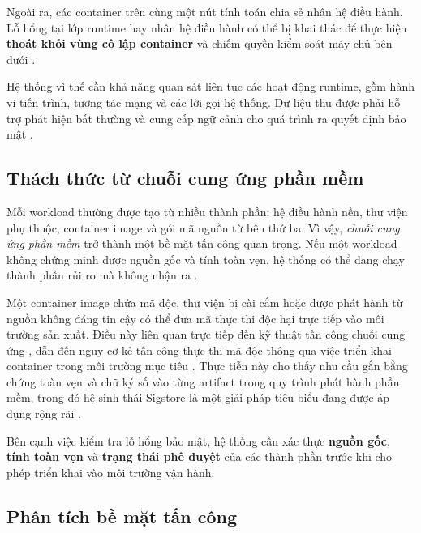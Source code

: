 Ngoài ra, các container trên cùng một nút tính toán chia sẻ nhân hệ điều hành. Lỗ hổng tại lớp runtime hay nhân hệ điều hành có thể bị khai thác để thực hiện \textbf{thoát khỏi vùng cô lập container} và chiếm quyền kiểm soát máy chủ bên dưới \parencite{cve_2024_21626,cve_2022_0847,mitre_t1611}.

Hệ thống vì thế cần khả năng quan sát liên tục các hoạt động runtime, gồm hành vi tiến trình, tương tác mạng và các lời gọi hệ thống. Dữ liệu thu được phải hỗ trợ phát hiện bất thường và cung cấp ngữ cảnh cho quá trình ra quyết định bảo mật \parencite{nist800137,nist800204c_devsecops_microservices,hubble_docs,tetragon_docs}.

\subsection{Thách thức từ chuỗi cung ứng phần mềm}

Mỗi workload thường được tạo từ nhiều thành phần: hệ điều hành nền, thư viện phụ thuộc, container image và gói mã nguồn từ bên thứ ba. Vì vậy, \textit{chuỗi cung ứng phần mềm} trở thành một bề mặt tấn công quan trọng. Nếu một workload không chứng minh được nguồn gốc và tính toàn vẹn, hệ thống có thể đang chạy thành phần rủi ro mà không nhận ra \parencite{cncf_swp,newman2022sigstore,sigstore_docs}.

Một container image chứa mã độc, thư viện bị cài cắm hoặc được phát hành từ nguồn không đáng tin cậy có thể đưa mã thực thi độc hại trực tiếp vào môi trường sản xuất. Điều này liên quan trực tiếp đến kỹ thuật tấn công chuỗi cung ứng \parencite{mitre_t1195_002}, dẫn đến nguy cơ kẻ tấn công thực thi mã độc thông qua việc triển khai container trong môi trường mục tiêu \parencite{mitre_t1610}. Thực tiễn này cho thấy nhu cầu gắn bằng chứng toàn vẹn và chữ ký số vào từng artifact trong quy trình phát hành phần mềm, trong đó hệ sinh thái Sigstore là một giải pháp tiêu biểu đang được áp dụng rộng rãi \parencite{newman2022sigstore,sigstore_docs}.

Bên cạnh việc kiểm tra lỗ hổng bảo mật, hệ thống cần xác thực \textbf{nguồn gốc}, \textbf{tính toàn vẹn} và \textbf{trạng thái phê duyệt} của các thành phần trước khi cho phép triển khai vào môi trường vận hành.

\subsection{Phân tích bề mặt tấn công}

